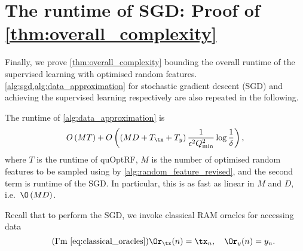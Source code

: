\setcounter{equation}{0}
\section{The runtime of SGD: Proof of \texorpdfstring{\cref{thm:overall_complexity}}{Theorem 4.4}}
\label{app:featureSamp_runtime}

Finally, we prove \cref{thm:overall_complexity} bounding the overall runtime of the supervised learning with optimised random features.
\cref{alg:sgd,alg:data_approximation} for stochastic gradient descent (SGD) and achieving the supervised learning respectively are also repeated in the following.

{
\begin{theorem*}
  The runtime of \cref{alg:data_approximation} is
  \begin{equation*}
    O\left(MT\right)+O\left(\left(MD+T_{\tx}+T_y\right)\frac{1}{{\epsilon}^2 Q_{\min}^2}\log\frac{1}{\delta}\right),
  \end{equation*}
  where $T$ is the runtime of quOptRF, $M$ is the number of optimised random features to be sampled using by \cref{alg:random_feature_revised}, and the second term is runtime of the SGD\@.
  In particular, this is as fast as linear in $M$ and $D$, i.e.\
  $\O\left(MD\right)$.
\end{theorem*}
}

Recall that to perform the SGD, we invoke classical RAM oracles for accessing data
\begin{equation*}
  \tag{I'm \ref{eq:classical_oracles}}
 \Or_{\tx}(n)=\tx_n,\quad \Or_y(n)=y_n.
\end{equation*}

